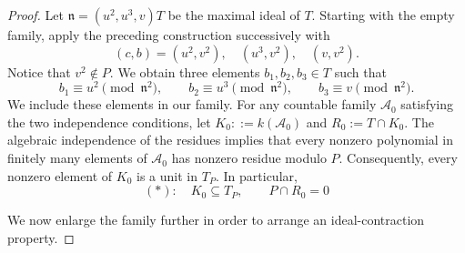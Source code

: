 \documentclass[11pt,a4paper]{amsart}
\numberwithin{equation}{section}
\begin{document}
\begin{proof}
	\medskip
	\noindent
Let
$	\mathfrak n=(u^2,u^3,v)T$	be the maximal ideal of $T$.	Starting with the empty family, apply the preceding construction	successively with	\[	(c,b)=(u^2,v^2),\quad	(u^3,v^2),\quad	(v,v^2).	\]	Notice that $v^2\notin P$. We obtain three elements	$b_1,b_2,b_3\in T$ such that	\[	b_1\equiv u^2\pmod{\mathfrak n^2},	\qquad	b_2\equiv u^3\pmod{\mathfrak n^2},	\qquad	b_3\equiv v\pmod{\mathfrak n^2}.	\]	We include these elements in our family.
For any countable family $\mathcal A_0$ satisfying the two	independence conditions, let	$	K_0::=k(\mathcal A_0)$ and $R_0:=T\cap K_0.$	The algebraic independence of the residues implies that every	nonzero polynomial in finitely many elements of $\mathcal A_0$	has nonzero residue modulo $P$. Consequently, every nonzero	element of $K_0$ is a unit in $T_P$. In particular,	$$(\ast):\quad 	K_0\subseteq T_P,\qquad P\cap R_0=0$$
	
	We now enlarge the family further in order to arrange an
	ideal-contraction property.
	

\end{proof}
\end{document}
